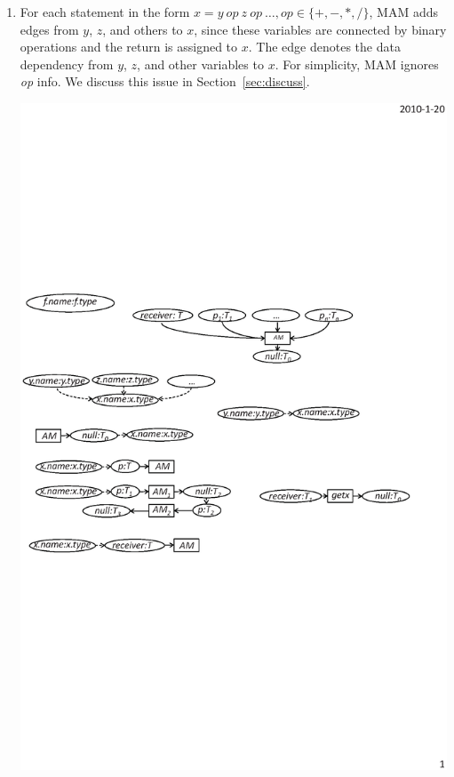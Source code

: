\begin{enumerate}
\item For each statement in the form $ x = y\ op\ z\ op\ \ldots, op \in \{+,-,*,/\}$,
MAM adds edges from $y$, $z$, and others to $x$, since these
variables are connected by binary operations and the return is
assigned to $x$. The edge denotes the data dependency from $y$, $z$,
and other variables to $x$. For simplicity, MAM ignores
\emph{op} info. We discuss this issue in
Section~\ref{sec:discuss}.\vspace*{-1.5ex}
\begin{center}
\includegraphics[scale=0.7,clip]{figure/rule9.eps}%
\end{center}\vspace*{-2ex}
\end{enumerate}\vspace*{-2ex}

